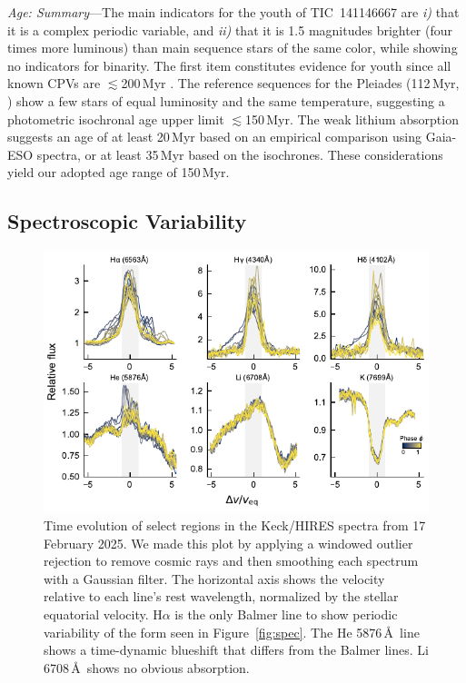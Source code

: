 \documentclass{nature3}
\begin{document}
\begin{methods}
{\it Age: Summary}---The main indicators for the youth of
TIC~141146667 are {\it i)} that it is a complex periodic variable, and
{\it ii)} that it is 1.5 magnitudes brighter (four times more
luminous) than main sequence stars of the same color, while showing no
indicators for binarity.  The first item constitutes evidence for
youth since all known CPVs are $\lesssim$200\,Myr \cite{Bouma2024}.
The reference sequences for the Pleiades (112\,Myr, \cite{Dahm2015})
show a few stars of equal luminosity and the same temperature,
suggesting a photometric isochronal age upper limit
$\lesssim$150\,Myr.  The weak lithium absorption suggests an age of at
least 20\,Myr based on an empirical comparison using Gaia-ESO spectra,
or at least 35\,Myr based on the \cite{Feiden2016} isochrones.  These
considerations yield our adopted age range of 150\,Myr.




\subsection{Spectroscopic Variability}\phantom{+}
\label{subsec:specvar}

\begin{figure}[!t]
  \centering
  \includegraphics[width=\textwidth]{figures/sf5.pdf}
  \caption{Time evolution of select regions in the Keck/HIRES
  spectra from 17 February 2025.
  We made this plot by applying a windowed outlier rejection to remove
  cosmic rays and then smoothing each spectrum with a Gaussian filter.
  The horizontal axis shows the velocity relative to each
  line's rest wavelength, normalized by the stellar equatorial
  velocity.  
  H$\alpha$ is the only Balmer line to show periodic variability of
  the form seen in Figure~\ref{fig:spec}.
  The He 5876\,\AA\ line shows a time-dynamic blueshift that 
  differs from the Balmer lines.
  Li 6708\,\AA\ shows no obvious absorption.
  }
  \label{fig:hirescuts}
\end{figure}


\end{methods}
\end{document}
